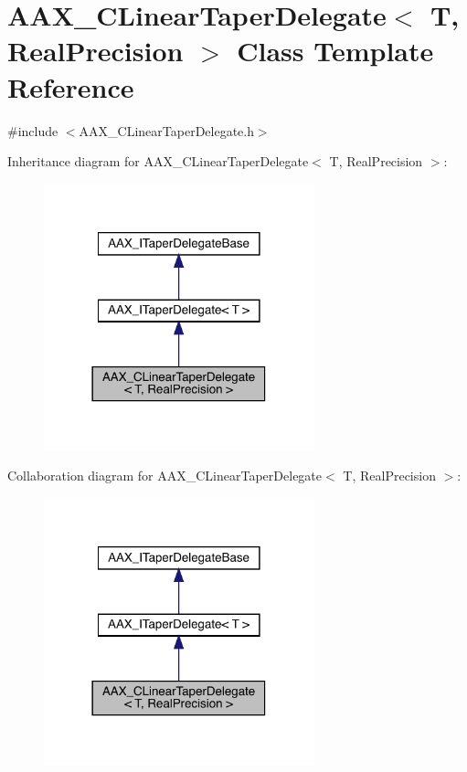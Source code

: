 \hypertarget{a01493}{}\section{A\+A\+X\+\_\+\+C\+Linear\+Taper\+Delegate$<$ T, Real\+Precision $>$ Class Template Reference}
\label{a01493}


{\ttfamily \#include $<$A\+A\+X\+\_\+\+C\+Linear\+Taper\+Delegate.\+h$>$}



Inheritance diagram for A\+A\+X\+\_\+\+C\+Linear\+Taper\+Delegate$<$ T, Real\+Precision $>$\+:
\nopagebreak
\begin{figure}[H]
\begin{center}
\leavevmode
\includegraphics[width=222pt]{a01492}
\end{center}
\end{figure}


Collaboration diagram for A\+A\+X\+\_\+\+C\+Linear\+Taper\+Delegate$<$ T, Real\+Precision $>$\+:
\nopagebreak
\begin{figure}[H]
\begin{center}
\leavevmode
\includegraphics[width=222pt]{a01491}
\end{center}
\end{figure}


